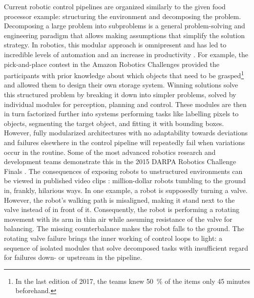\documentclass[\home/main.tex]{subfiles}
\begin{document}
Current robotic control pipelines are organized similarly to the given food processor example: structuring the environment and decomposing the problem. Decomposing a large problem into subproblems is a general problem-solving and engineering paradigm that allows making assumptions that simplify the solution strategy.
In robotics, this modular approach is omnipresent and has led to incredible levels of automation and an increase in productivity \autocite{Graetz2018}. For example, the pick-and-place contest in the Amazon Robotics Challenges provided the participants with prior knowledge about which objects that need to be grasped\footnote{In the last edition of 2017, the teams knew \qty{50}{\percent} of the items only 45 minutes beforehand.} and allowed them to design their own storage system. Winning solutions \autocite{ijcai2017,morrison2018cartman} solve this structured problem by breaking it down into simpler problems, solved by individual modules for perception, planning and control. These modules are then in turn factorized further into systems performing tasks like labelling pixels to objects, segmenting the target object, and fitting it with bounding boxes.
However, fully modularized architectures with no adaptability towards deviations and failures elsewhere in the control pipeline will repeatedly fail when variations occur in the routine. Some of the most advanced robotics research and development teams demonstrate this in the 2015 DARPA Robotics Challenge Finals \autocite{DARPA2015}. The consequences of exposing robots to unstructured environments can be viewed in published video clips \autocite{darpaVideos}: million-dollar robots tumbling to the ground in, frankly, hilarious ways. In one example, a robot is supposedly turning a valve. However, the robot's walking path is misaligned, making it stand next to the valve instead of in front of it. Consequently, the robot is performing a rotating movement with its arm in thin air while assuming resistance of the valve for balancing. The missing counterbalance makes the robot falls to the ground. The rotating valve failure brings the inner working of control loops to light: a sequence of isolated modules that solve decomposed tasks with insufficient regard for failures down- or upstream in the pipeline.
\end{document}
